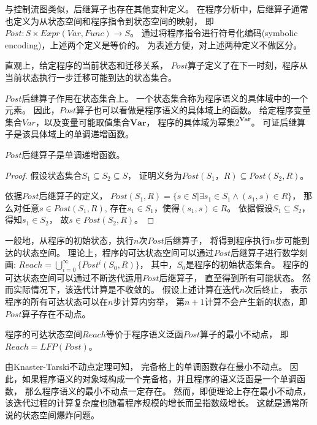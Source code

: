 与控制流图类似，后继算子也存在其他变种定义。
在程序分析中，后继算子通常也定义为从状态空间和程序指令到状态空间的映射，
即$Post: S \times Expr(Var, Func) \rightarrow S$。
通过将程序指令进行符号化编码(symbolic encoding)，上述两个定义是等价的。
为表述方便，对上述两种定义不做区分。

直观上，给定程序的当前状态和迁移关系，
$Post$算子定义了在下一时刻，程序从当前状态执行一步迁移可能到达的状态集合。

$Post$后继算子作用在状态集合上。
一个状态集合称为程序语义的具体域中的一个元素。
因此，$Post$算子也可以看做是程序语义的具体域上的函数。
给定程序变量集合$Var$，以及变量可能取值集合$\textbf{Var}$，
程序的具体域为幂集$2^{\textbf{Var}}$。
可证后继算子是该具体域上的单调递增函数。

\begin{lemma}
$Post$后继算子是单调递增函数。
\end{lemma}

\begin{proof}
	假设状态集合$S_1 \subseteq S_2 \subseteq S$，
	证明义务为$Post(S_1， R) \subseteq Post(S_2,R)$。
	
	依据$Post$后继算子的定义，
	$Post(S_1, R) = \{ s\in S | \exists s_1 \in S_1 \wedge (s_1, s)\in R \}$，
	那么对任意$s\in Post(S_1, R)$,
	存在$s_1\in S_1$，使得$(s_1, s)\in R$。
	依据假设$S_1 \subseteq S_2$，得知$s_1 \in S_2$，
	故$s\in Post(S_2, R)$。
\end{proof}


一般地，从程序的初始状态，执行$n$次$Post$后继算子，
将得到程序执行$n$步可能到达的状态空间。
理论上，程序的可达状态空间可以通过$Post$后继算子进行数学刻画:
$Reach = \bigcup_{i=0}^{\infty}\{Post^{i}(S_0, R)\}$，
其中，$S_0$是程序的初始状态集合。
程序的可达状态空间可以通过不断迭代运用$Post$后继算子，
直至得到所有可能状态。
然而实际情况下，该迭代计算是不收敛的。
假设上述计算在迭代$n$次后终止，
表示程序的所有可达状态可以在$n$步计算内穷举，
第$n+1$计算不会产生新的状态，即$Post$算子存在不动点。


\begin{lemma}
程序的可达状态空间$Reach$等价于程序语义泛函$Post$算子的最小不动点，
即$Reach = LFP(Post)$。
\end{lemma}

由Knaster-Tarski不动点定理可知，	完备格上的单调函数存在最小不动点。
因此，如果程序语义的对象域构成一个完备格，并且程序的语义泛函是一个单调函数，
那么程序语义的最小不动点一定存在。
然而，即便理论上存在最小不动点，
该迭代过程的计算复杂度也随着程序规模的增长而呈指数级增长。
这就是通常所说的状态空间爆炸问题。

